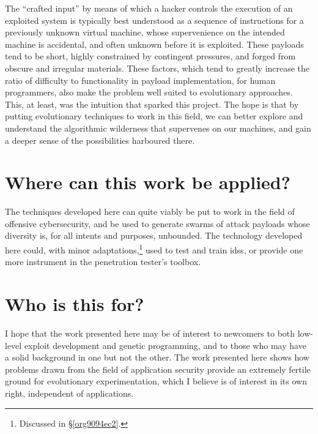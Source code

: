 \documentclass[12pt,glossary]{dalthesis}
\begin{document}
The ``crafted input'' by means of which a hacker controls the execution of
an exploited system is typically best understood as a sequence of instructions
for a previously unknown virtual machine, whose supervenience on the intended
machine is accidental, and often unknown before it is exploited.
These payloads tend to be short, highly constrained by contingent
pressures, and forged from obscure and irregular materials. These factors,
which tend to greatly increase the ratio of difficulty to functionality in
payload implementation, for human programmers, also make the problem
well suited to evolutionary approaches. This, at least, was the intuition
that sparked this project. The hope is that by putting evolutionary techniques
to work in this field, we can better explore and understand the algorithmic
wilderness that supervenes on our machines, and gain a deeper sense of the
possibilities harboured there.

\section{Where can this work be applied?}
\label{sec:org3353545}
The techniques developed here can quite viably be put to work in the field of
offensive cybersecurity, and be used to generate swarms of attack payloads whose
diversity is, for all intents and purposes, unbounded. The technology developed
here could, with minor adaptations,\footnote{Discussed in \S \ref{org9094ec2}.} used
to test and train \glspl{ids}, or provide one more instrument in the penetration
tester's toolbox.

\section{Who is this for?}
\label{sec:org12d5eed}

I hope that the work presented here may be of interest to newcomers to
both low-level exploit development and genetic programming, and to those
who may have a solid background in one but not the other. The work presented
here shows how problems drawn from the field of application security provide
an extremely fertile ground for evolutionary experimentation, which I believe
is of interest in its own right, independent of applications. 
\end{document}
